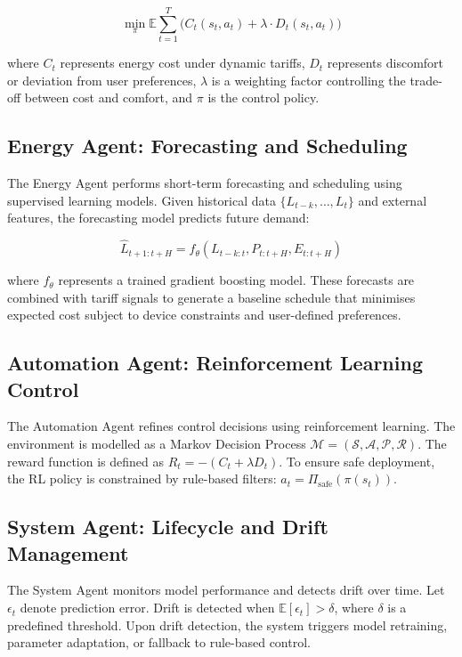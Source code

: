 \documentclass[11pt,a4paper]{article}
\begin{document}
\begin{equation}
\min_{\pi} \mathbb{E} \sum_{t=1}^{T} \big(C_t(s_t, a_t) + \lambda \cdot D_t(s_t, a_t)\big)
\end{equation}

where $C_t$ represents energy cost under dynamic tariffs, $D_t$ represents discomfort or deviation from user preferences, $\lambda$ is a weighting factor controlling the trade-off between cost and comfort, and $\pi$ is the control policy.

\subsection{Energy Agent: Forecasting and Scheduling}

The Energy Agent performs short-term forecasting and scheduling using supervised learning models. Given historical data $\{L_{t-k}, \dots, L_t\}$ and external features, the forecasting model predicts future demand:

\begin{equation}
\hat{L}_{t+1:t+H} = f_\theta(L_{t-k:t}, P_{t:t+H}, E_{t:t+H})
\end{equation}

where $f_\theta$ represents a trained gradient boosting model. These forecasts are combined with tariff signals to generate a baseline schedule that minimises expected cost subject to device constraints and user-defined preferences.

\subsection{Automation Agent: Reinforcement Learning Control}

The Automation Agent refines control decisions using reinforcement learning. The environment is modelled as a Markov Decision Process $\mathcal{M} = (\mathcal{S}, \mathcal{A}, \mathcal{P}, \mathcal{R})$. The reward function is defined as $R_t = -(C_t + \lambda D_t)$. To ensure safe deployment, the RL policy is constrained by rule-based filters: $a_t = \Pi_{\text{safe}}(\pi(s_t))$.

\subsection{System Agent: Lifecycle and Drift Management}

The System Agent monitors model performance and detects drift over time. Let $\epsilon_t$ denote prediction error. Drift is detected when $\mathbb{E}[\epsilon_t] > \delta$, where $\delta$ is a predefined threshold. Upon drift detection, the system triggers model retraining, parameter adaptation, or fallback to rule-based control.
\end{document}
